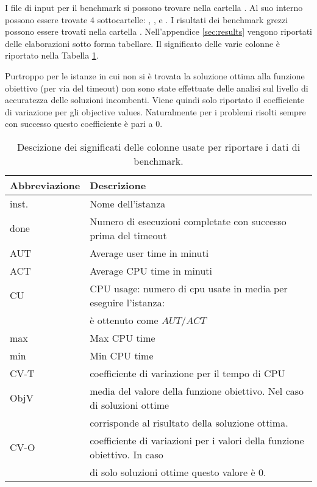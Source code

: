 I file di input per il benchmark si possono trovare nella cartella .
Al suo interno possono essere trovate $4$ sottocartelle: , 
,  e .
I risultati dei benchmark grezzi possono essere trovati nella cartella 
. Nell'appendice  \ref{sec:results} vengono riportati delle
elaborazioni sotto forma tabellare.
Il significato delle varie colonne è riportato nella Tabella \ref{table:description}.

Purtroppo per le istanze in cui non si è trovata la soluzione ottima alla
funzione obiettivo (per via del timeout) 
non sono state effettuate delle analisi sul livello di accuratezza
delle soluzioni incombenti.
Viene quindi solo riportato il coefficiente di variazione per gli
objective values. Naturalmente 
per i problemi risolti sempre con successo questo coefficiente è pari a $0$.

\begin{table}
\centering
\small
\begin{tabular}{| l| l |}
\hline
Abbreviazione & Descrizione \\
\hline
inst. & Nome dell'istanza \\
done & Numero di esecuzioni completate con successo prima del timeout\\
AUT & Average user time in minuti \\
ACT & Average CPU time in minuti\\
CU  & CPU usage: numero di cpu usate in media per eseguire l'istanza: \\
	& è ottenuto come $AUT/ACT$\\
max & Max CPU time \\
min & Min CPU time \\
CV-T & coefficiente di variazione per il tempo di CPU \\
ObjV & media del valore della funzione obiettivo. Nel caso di soluzioni ottime \\
	& corrisponde al risultato della soluzione ottima.\\
CV-O & coefficiente di variazioni per i valori della funzione obiettivo. In caso \\
& di solo soluzioni ottime questo valore è $0$. \\
\hline
\end{tabular}
\caption{Descizione dei significati delle colonne usate per riportare i dati
di benchmark.}
\label{table:description}
\end{table}


